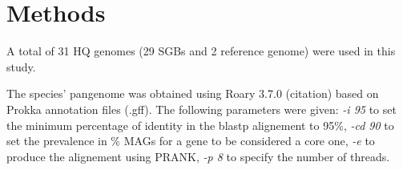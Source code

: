 \section*{Methods}



A total of 31 HQ genomes (29 SGBs and 2 reference genome) were used in this study. 

\nocite{Tange2011a}



The species' pangenome was obtained using Roary 3.7.0 (citation) based on Prokka annotation files (.gff). 
The following parameters were given: \emph{-i 95} to set the minimum percentage of identity
in the blastp alignement to 95\%, \emph{-cd 90} to set the prevalence in \% MAGs for a gene
to be considered a core one, \emph{-e} to produce the alignement using PRANK, \emph{-p 8} to
specify the number of threads. 









